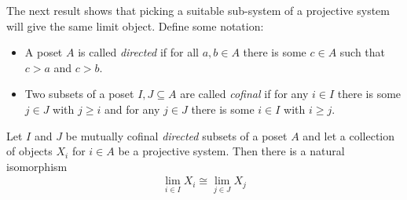       The next result shows that picking a suitable sub-system of a projective system will give the same limit object.
      Define some notation:
      \begin{itemize}
        \item A poset $A$ is called \emph{directed} if for all $a,b\in A$ there is some $c\in A$ such that $c>a$ and $c>b$.
        \item Two subsets of a poset $I,J\subseteq A$ are called \emph{cofinal} if for any $i\in I$ there is some $j\in J$ with $j\ge i$ and for any $j\in J$ there is some $i\in I$ with $i\ge j$.
      \end{itemize}
      \begin{thm}
        Let $I$ and $J$ be mutually cofinal \emph{directed} subsets of a poset $A$ and let a collection of objects $X_i$ for $i\in A$ be a projective system.
        Then there is a natural isomorphism
        \begin{align*}
          \lim_{i\in I} X_i \cong \lim_{j\in J} X_j
        \end{align*}
      \end{thm}
